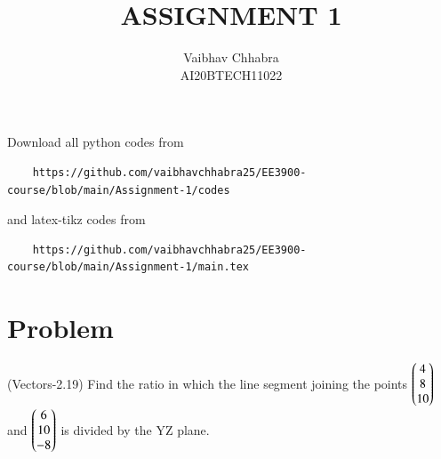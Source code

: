 \documentclass[journal,12pt,twocolumn]{IEEEtran}
\begin{document}
     \def\topbox#1{\raisebox{-\baselineskip}[0in][0in]{#1}}
     \def\midbox#1{\raisebox{-0.5\baselineskip}[0in][0in]{#1}}
\vspace{3cm}
\title{ASSIGNMENT 1}
\author{Vaibhav Chhabra\\ AI20BTECH11022}
\maketitle
\newpage
\bigskip
\renewcommand{\thefigure}{\theenumi}
\renewcommand{\thetable}{\theenumi}
Download all python codes from 
\begin{lstlisting}
    https://github.com/vaibhavchhabra25/EE3900-course/blob/main/Assignment-1/codes
\end{lstlisting}
%
and latex-tikz codes from 
%
\begin{lstlisting}
    https://github.com/vaibhavchhabra25/EE3900-course/blob/main/Assignment-1/main.tex
\end{lstlisting}
%
\section{Problem}
(Vectors-2.19) Find the ratio in which the line segment joining the points $\begin{pmatrix}4\\8\\10\end{pmatrix}$ and $\begin{pmatrix}6\\10\\-8\end{pmatrix}$ is divided by the YZ plane.
\end{document}
